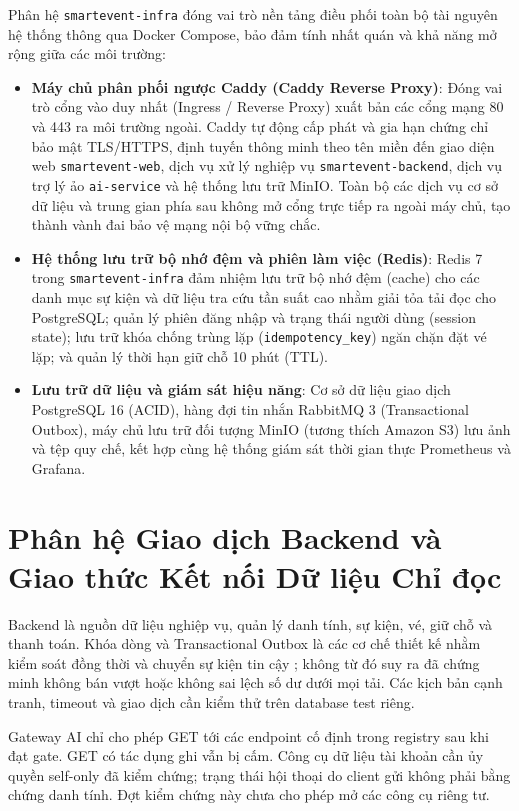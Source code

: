 Phân hệ \texttt{smartevent-infra} đóng vai trò nền tảng điều phối toàn bộ tài nguyên hệ thống thông qua Docker Compose, bảo đảm tính nhất quán và khả năng mở rộng giữa các môi trường:
\begin{itemize}[nosep]
  \item \textbf{Máy chủ phân phối ngược Caddy (Caddy Reverse Proxy)}: Đóng vai trò cổng vào duy nhất (Ingress / Reverse Proxy) xuất bản các cổng mạng 80 và 443 ra môi trường ngoài. Caddy tự động cấp phát và gia hạn chứng chỉ bảo mật TLS/HTTPS, định tuyến thông minh theo tên miền đến giao diện web \texttt{smartevent-web}, dịch vụ xử lý nghiệp vụ \texttt{smartevent-backend}, dịch vụ trợ lý ảo \texttt{ai-service} và hệ thống lưu trữ MinIO. Toàn bộ các dịch vụ cơ sở dữ liệu và trung gian phía sau không mở cổng trực tiếp ra ngoài máy chủ, tạo thành vành đai bảo vệ mạng nội bộ vững chắc.
  \item \textbf{Hệ thống lưu trữ bộ nhớ đệm và phiên làm việc (Redis)}: Redis 7 trong \texttt{smartevent-infra} đảm nhiệm lưu trữ bộ nhớ đệm (cache) cho các danh mục sự kiện và dữ liệu tra cứu tần suất cao nhằm giải tỏa tải đọc cho PostgreSQL; quản lý phiên đăng nhập và trạng thái người dùng (session state); lưu trữ khóa chống trùng lặp (\texttt{idempotency\_key}) ngăn chặn đặt vé lặp; và quản lý thời hạn giữ chỗ 10 phút (TTL).
  \item \textbf{Lưu trữ dữ liệu và giám sát hiệu năng}: Cơ sở dữ liệu giao dịch PostgreSQL 16 (ACID), hàng đợi tin nhắn RabbitMQ 3 (Transactional Outbox), máy chủ lưu trữ đối tượng MinIO (tương thích Amazon S3) lưu ảnh và tệp quy chế, kết hợp cùng hệ thống giám sát thời gian thực Prometheus và Grafana.
\end{itemize}

\section{Phân hệ Giao dịch Backend và Giao thức Kết nối Dữ liệu Chỉ đọc}
\label{sec:backend_read_only_protocol}

Backend là nguồn dữ liệu nghiệp vụ, quản lý danh tính, sự kiện, vé, giữ chỗ và thanh toán. Khóa dòng và Transactional Outbox là các cơ chế thiết kế nhằm kiểm soát đồng thời và chuyển sự kiện tin cậy \cite{ddia_kleppmann_2017, microservices_richardson_2018}; không từ đó suy ra đã chứng minh không bán vượt hoặc không sai lệch số dư dưới mọi tải. Các kịch bản cạnh tranh, timeout và giao dịch cần kiểm thử trên database test riêng.

Gateway AI chỉ cho phép GET tới các endpoint cố định trong registry sau khi đạt gate. GET có tác dụng ghi vẫn bị cấm. Công cụ dữ liệu tài khoản cần ủy quyền self-only đã kiểm chứng; trạng thái hội thoại do client gửi không phải bằng chứng danh tính. Đợt kiểm chứng này chưa cho phép mở các công cụ riêng tư.

